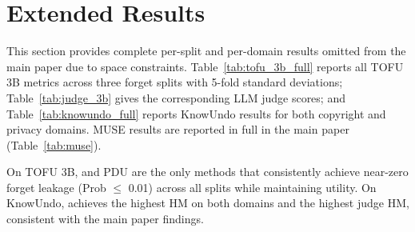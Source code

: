 \section{Extended Results}
\label{app:results}
\label{app:tofu_full}

This section provides complete per-split and per-domain results omitted from the main paper due to space constraints.
Table~\ref{tab:tofu_3b_full} reports all TOFU 3B metrics across three forget splits with 5-fold standard deviations; Table~\ref{tab:judge_3b} gives the corresponding LLM judge scores; and Table~\ref{tab:knowundo_full} reports KnowUndo results for both copyright and privacy domains.
MUSE results are reported in full in the main paper (Table~\ref{tab:muse}).

On TOFU 3B, \method and PDU are the only methods that consistently achieve near-zero forget leakage (Prob $\leq$ 0.01) across all splits while maintaining utility.
On KnowUndo, \method achieves the highest HM on both domains and the highest judge HM, consistent with the main paper findings.

